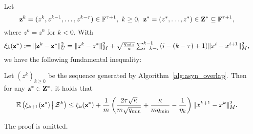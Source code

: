 {Let 
\begin{equation*}%
\vz^k=(z^k,z^{k-1},\ldots,z^{k-\tau})\in \FF^{\tau+1},~k\ge 0,~\vz^* =(z^*,\ldots,z^*)\in\vZ^*\subseteq\FF^{\tau+1},
\end{equation*}
where $z^{k}=z^{0}$ for $k<0$. With
\begin{equation}\label{eqn:xi}
\textstyle \xi_k(\vz^*) := \|\vz^k-\vz^*\|_U^2=\|z^{k} - z^*\|_M^2 +
\sqrt{q_{\min}\over \kappa}\sum_{i=k-\tau}^{k-1} (i-(k-\tau)+1) \|
x^{i} - x^{i+1}\|_M^2,
\end{equation}
we have the following fundamental inequality:
\begin{thm}\label{thm:fund_inquality}
Let $(z^k)_{k\geq 0}$ be the sequence generated by Algorithm~\ref{alg:asyn_overlap}. Then for any ${\mathbf{z}}^*\in{\mathbf{Z}}^*$, it holds that %
\begin{equation}\label{eqn:fund_inquality}
\begin{aligned}
\mathbb{E}\left(\xi_{k+1}(\vz^*) \,\big|\, \cZ^k\right)  
\leq  \xi_k(\vz^*)  + \frac{1}{m}
\left(\frac{2\tau\sqrt{\kappa}}{m\sqrt{q_{\min}}} +
{\kappa\over mq_{\min}} - \frac{1}{ \eta_k}\right)
\|\bar{x}^{k+1} - x^k \|_M^2.
\end{aligned}
\end{equation}
\end{thm}

The proof is omitted. 
}